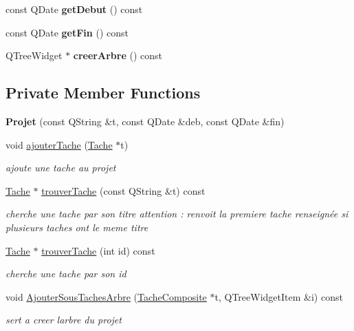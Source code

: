 \begin{DoxyCompactItemize}
\item 
\hypertarget{class_projet_a8f86b55e3bd1da9b4a08123633bbe6e6}{}const Q\+Date {\bfseries get\+Debut} () const \label{class_projet_a8f86b55e3bd1da9b4a08123633bbe6e6}

\item 
\hypertarget{class_projet_a13175c00718ef22e0426b48be95d58a7}{}const Q\+Date {\bfseries get\+Fin} () const \label{class_projet_a13175c00718ef22e0426b48be95d58a7}

\item 
\hypertarget{class_projet_ab907e05a7eec63516f99e3ac832fd12c}{}Q\+Tree\+Widget $\ast$ {\bfseries creer\+Arbre} () const \label{class_projet_ab907e05a7eec63516f99e3ac832fd12c}

\end{DoxyCompactItemize}
\subsection*{Private Member Functions}
\begin{DoxyCompactItemize}
\item 
\hypertarget{class_projet_ac7577a415b9d5da0db0c7a2c2c23887f}{}{\bfseries Projet} (const Q\+String \&t, const Q\+Date \&deb, const Q\+Date \&fin)\label{class_projet_ac7577a415b9d5da0db0c7a2c2c23887f}

\item 
void \hyperlink{class_projet_adf4f7c0f48ee4661b57be82af2b056ae}{ajouter\+Tache} (\hyperlink{class_tache}{Tache} $\ast$t)
\begin{DoxyCompactList}\small\item\em ajoute une tache au projet \end{DoxyCompactList}\item 
\hyperlink{class_tache}{Tache} $\ast$ \hyperlink{class_projet_a273015eb3bdc1910712a53c484d31da9}{trouver\+Tache} (const Q\+String \&t) const 
\begin{DoxyCompactList}\small\item\em cherche une tache par son titre attention \+: renvoit la premiere tache renseignée si plusieurs taches ont le meme titre \end{DoxyCompactList}\item 
\hyperlink{class_tache}{Tache} $\ast$ \hyperlink{class_projet_a8675b64f9fb5e6e7c1375a2ee5ad851f}{trouver\+Tache} (int id) const 
\begin{DoxyCompactList}\small\item\em cherche une tache par son id \end{DoxyCompactList}\item 
void \hyperlink{class_projet_a81773cdbd069096d98190acf02875113}{Ajouter\+Sous\+Taches\+Arbre} (\hyperlink{class_tache_composite}{Tache\+Composite} $\ast$t, Q\+Tree\+Widget\+Item \&i) const 
\begin{DoxyCompactList}\small\item\em sert a creer l\textquotesingle{}arbre du projet \end{DoxyCompactList}\end{DoxyCompactItemize}
